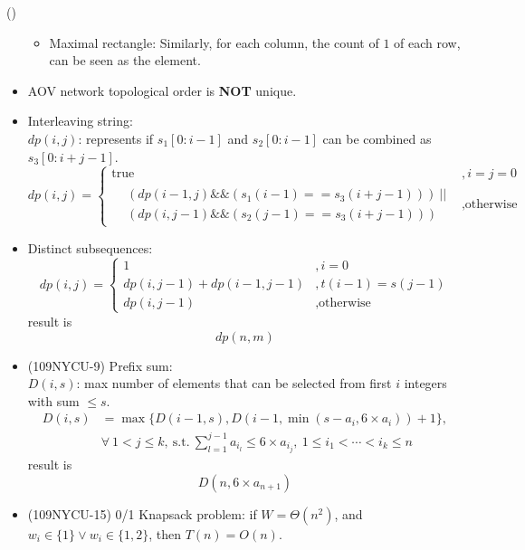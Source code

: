 \begin{theorem}{()}
\begin{itemize}
\begin{itemize}
            \item Maximal rectangle: Similarly, for each column, the count of $1$ of each row, can be seen as the element.
        \end{itemize}
        \item AOV network topological order is \textbf{NOT} unique.
        \item Interleaving string: \\
        $dp(i, j)$: represents if $s_1[0: i - 1]$ and $s_2[0: i - 1]$ can be combined as $s_3[0: i + j - 1]$. \begin{equation}
            dp(i, j) = \begin{cases}
                \text{true} &, i = j = 0 \\
                \begin{aligned}
                    & (dp(i - 1, j) \&\& (s_1(i - 1) == s_3(i + j - 1))) \ || \\
                    & (dp(i, j - 1) \&\& (s_2(j - 1) == s_3(i + j - 1)))
                \end{aligned} &, \text{otherwise}
            \end{cases}
        \end{equation}
        \item Distinct subsequences: \begin{equation}
            dp(i, j) = \begin{cases}
                1 &, i = 0 \\
                dp(i, j - 1) + dp(i - 1, j - 1) &, t(i - 1) = s(j - 1) \\
                dp(i, j - 1) &, \text{otherwise}
            \end{cases}            
        \end{equation} result is \begin{equation}
            dp(n, m)
        \end{equation}
        \item (109NYCU-9) Prefix sum: \\
        $D(i, s)$: max number of elements that can be selected from first $i$ integers with sum $\le s$. \begin{equation}
            \begin{aligned}
                D(i, s) & = \max\{D(i - 1, s), D(i - 1, \min(s - a_i, 6 \times a_i)) + 1\}, \\
                & \forall \ 1 < j \le k, \ \text{s.t.} \ \sum_{l = 1}^{j - 1}a_{i_l} \le 6 \times a_{i_j}, \ 1 \le i_1 < \cdots < i_k \le n
            \end{aligned}
        \end{equation} result is \begin{equation}
            D(n, 6 \times a_{n + 1})
        \end{equation}
        \item (109NYCU-15) 0/1 Knapsack problem: if $W = \Theta(n^2)$, and $w_i \in \{1\} \lor w_i \in \{1, 2\}$, then $T(n) = O(n)$.
    \end{itemize}
\end{theorem}
